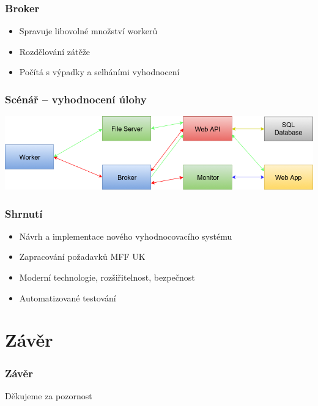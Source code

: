 \documentclass{beamer}
\begin{document}
\begin{frame}
	\frametitle{Broker}
	\begin{itemize}
		\item Spravuje libovolné množství workerů
		\item Rozdělování zátěže
		\item Počítá s výpadky a selháními vyhodnocení
	\end{itemize}
\end{frame}

\begin{frame}
	\frametitle{Scénář -- vyhodnocení úlohy}
	\begin{center}
		\includegraphics[width=1\textwidth]{images/communication.png}
	\end{center}
\end{frame}

\begin{frame}
	\frametitle{Shrnutí}
	\begin{itemize}
		\item Návrh a implementace nového vyhodnocovacího systému
		\item Zapracování požadavků MFF UK
		\item Moderní technologie, rozšiřitelnost, bezpečnost
		\item Automatizované testování
	\end{itemize}
\end{frame}

\section{Závěr}
\begin{frame}
	\frametitle{Závěr}
	\centering
	\LARGE{Děkujeme za pozornost}
\end{frame}
\end{document}
